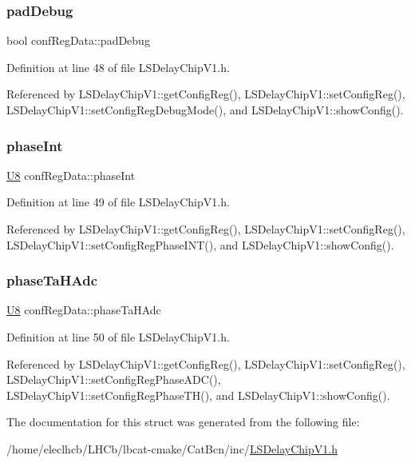 \subsubsection{\texorpdfstring{pad\+Debug}{padDebug}}
{\footnotesize\ttfamily bool conf\+Reg\+Data\+::pad\+Debug}



Definition at line 48 of file L\+S\+Delay\+Chip\+V1.\+h.



Referenced by L\+S\+Delay\+Chip\+V1\+::get\+Config\+Reg(), L\+S\+Delay\+Chip\+V1\+::set\+Config\+Reg(), L\+S\+Delay\+Chip\+V1\+::set\+Config\+Reg\+Debug\+Mode(), and L\+S\+Delay\+Chip\+V1\+::show\+Config().

\mbox{\label{structconfRegData_aee4fd08aceaaf19fcb8edfe8aa50f5ab}} 
\subsubsection{\texorpdfstring{phase\+Int}{phaseInt}}
{\footnotesize\ttfamily \hyperlink{ICECALv3_8h_a3cb25ca6f51f003950f9625ff05536fc}{U8} conf\+Reg\+Data\+::phase\+Int}



Definition at line 49 of file L\+S\+Delay\+Chip\+V1.\+h.



Referenced by L\+S\+Delay\+Chip\+V1\+::get\+Config\+Reg(), L\+S\+Delay\+Chip\+V1\+::set\+Config\+Reg(), L\+S\+Delay\+Chip\+V1\+::set\+Config\+Reg\+Phase\+I\+N\+T(), and L\+S\+Delay\+Chip\+V1\+::show\+Config().

\mbox{\label{structconfRegData_a2e471f30b32e57270cb2edb0e420cf1b}} 
\subsubsection{\texorpdfstring{phase\+Ta\+H\+Adc}{phaseTaHAdc}}
{\footnotesize\ttfamily \hyperlink{ICECALv3_8h_a3cb25ca6f51f003950f9625ff05536fc}{U8} conf\+Reg\+Data\+::phase\+Ta\+H\+Adc}



Definition at line 50 of file L\+S\+Delay\+Chip\+V1.\+h.



Referenced by L\+S\+Delay\+Chip\+V1\+::get\+Config\+Reg(), L\+S\+Delay\+Chip\+V1\+::set\+Config\+Reg(), L\+S\+Delay\+Chip\+V1\+::set\+Config\+Reg\+Phase\+A\+D\+C(), L\+S\+Delay\+Chip\+V1\+::set\+Config\+Reg\+Phase\+T\+H(), and L\+S\+Delay\+Chip\+V1\+::show\+Config().



The documentation for this struct was generated from the following file\+:\begin{DoxyCompactItemize}
\item 
/home/eleclhcb/\+L\+H\+Cb/lbcat-\/cmake/\+Cat\+Bcn/inc/\hyperlink{LSDelayChipV1_8h}{L\+S\+Delay\+Chip\+V1.\+h}\end{DoxyCompactItemize}
